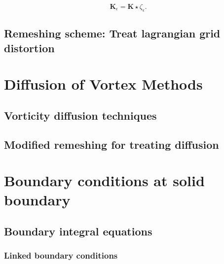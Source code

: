 \begin{equation}
\mathbf{K}_{\epsilon} = \mathbf{K} \star \zeta_{\epsilon}.
\end{equation}

\subsection{Remeshing scheme: Treat lagrangian grid distortion}

\section{Diffusion of Vortex Methods}

\subsection{Vorticity diffusion techniques}

\subsection{Modified remeshing for treating diffusion}

\section{Boundary conditions at solid boundary}

\subsection{Boundary integral equations}

\subsubsection{Linked boundary conditions}

